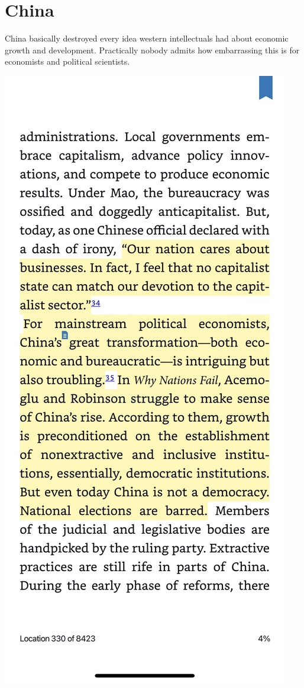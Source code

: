 \documentclass[
]{book}
\begin{document}
\hypertarget{china-1}{%
\section{China}\label{china-1}}

China basically destroyed every idea western intellectuals had about economic growth and development.
Practically nobody admits how embarrassing this is for economists and political scientists.

\includegraphics{fig/chinagrowth1.jpeg}
\end{document}
